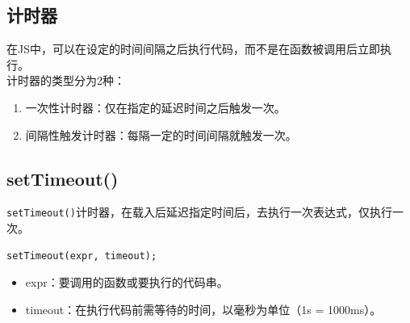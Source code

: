 \subsection{计时器}

在JS中，可以在设定的时间间隔之后执行代码，而不是在函数被调用后立即执行。 \\

计时器的类型分为2种：

\begin{enumerate}
	\item 一次性计时器：仅在指定的延迟时间之后触发一次。
	\item 间隔性触发计时器：每隔一定的时间间隔就触发一次。
\end{enumerate}

\begin{table}[H]
	\centering
	\caption{计时器方法}
\end{table}

\subsection{setTimeout()}

\lstinline|setTimeout()|计时器，在载入后延迟指定时间后，去执行一次表达式，仅执行一次。 \\

\begin{lstlisting}[style=htmlcssjs]
setTimeout(expr, timeout);
\end{lstlisting}

\begin{itemize}
	\item expr：要调用的函数或要执行的代码串。
	\item timeout：在执行代码前需等待的时间，以毫秒为单位（1s = 1000ms）。
\end{itemize}

